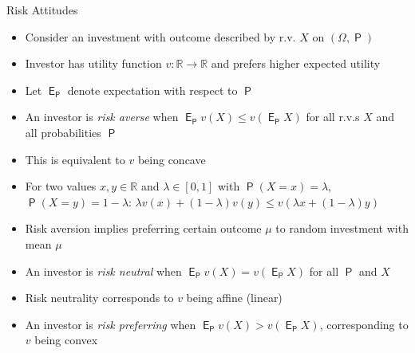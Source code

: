 \documentclass[10pt]{beamer}
\newcommand{\ds}{\displaystyle}
\DeclareMathOperator\prb{\mathsf{P}}
\DeclareMathOperator\expc{\mathsf{E}}
\theoremstyle{definition}
\begin{document}
\begin{frame}{Risk Attitudes}
  \begin{itemize}[<+->]
    \item Consider an investment with outcome described by r.v. $X$ on $(\Omega, \prb)$
    \item Investor has utility function $v: \mathbb{R} \to \mathbb{R}$ and prefers higher expected utility
    \item Let $\expc_{\prb}$ denote expectation with respect to $\prb$
    \item An investor is \emph{risk averse} when $\ds\expc_{\prb} v(X) \leqslant v(\expc_{\prb} X)$
      for all r.v.s $X$ and all probabilities $\prb$
    \item This is equivalent to $v$ being concave
    \item For two values $x, y \in \mathbb{R}$ and $\lambda \in [0, 1]$ with $\prb(X = x) = \lambda$, $\prb(X = y) = 1 - \lambda$: $\ds\lambda v(x) + (1-\lambda)v(y) \leqslant v(\lambda x + (1-\lambda)y)$
    \item Risk aversion implies preferring certain outcome $\mu$ to random investment with mean $\mu$
    \item An investor is \emph{risk neutral} when $\expc_{\prb} v(X) = v(\expc_{\prb} X)$ for all $\prb$ and $X$
    \item Risk neutrality corresponds to $v$ being affine (linear)
    \item An investor is \emph{risk preferring} when $\expc_{\prb} v(X) > v(\expc_{\prb} X)$, corresponding to $v$ being convex
  \end{itemize}
\end{frame}
\end{document}
